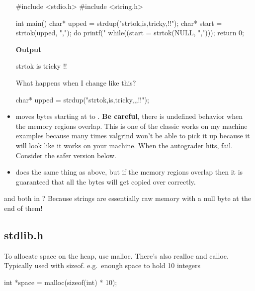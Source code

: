 \begin{itemize}
\begin{code}[language=C]
#include <stdio.h>
#include <string.h>

int main(){
    char* upped = strdup("strtok,is,tricky,!!");
    char* start = strtok(upped, ",");
    do{
        printf("%
    }while((start = strtok(NULL, ",")));
    return 0;
}
\end{code}

\textbf{Output}

\begin{code}[language=console]
strtok
is
tricky
!!
\end{code}

What happens when I change  like this?

\begin{code}[language=C]
char* upped = strdup("strtok,is,tricky,,,!!");
\end{code}

\item {} moves  bytes starting at  to . \textbf{Be careful}, there is undefined behavior when the memory regions overlap. This is one of the classic works on my machine examples because many times valgrind won't be able to pick it up because it will look like it works on your machine. When the autograder hits, fail. Consider the safer version below.

\item {} does the same thing as above, but if the memory regions overlap then it is guaranteed that all the bytes will get copied over correctly.

\end{itemize}

 and  both in ? Because strings are essentially raw memory with a null byte at the end of them! 

\subsection{stdlib.h}

To allocate space on the heap, use malloc. There's also realloc and calloc. Typically used with sizeof. e.g.~enough space to hold 10 integers

\begin{code}[language=C]
int *space = malloc(sizeof(int) * 10);
\end{code}

